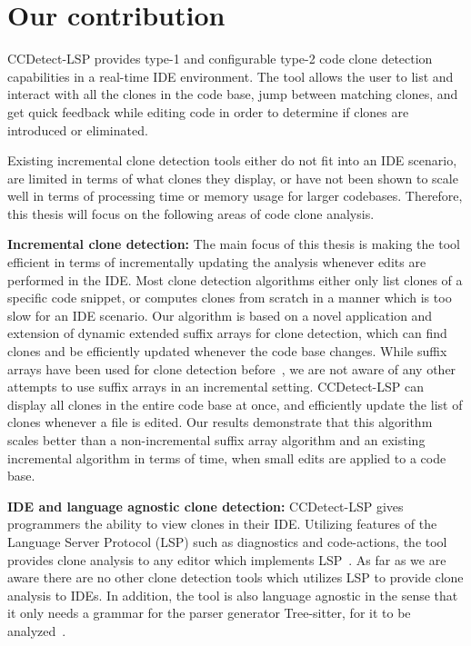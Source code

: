 \section{Our contribution}

CCDetect-LSP provides type-1 and configurable type-2 code clone detection capabilities in
a real-time IDE environment. The tool allows the user to list and interact with all the
clones in the code base, jump between matching clones, and get quick feedback while
editing code in order to determine if clones are introduced or eliminated.

Existing incremental clone detection tools either do not fit into an IDE scenario, are
limited in terms of what clones they display, or have not been shown to scale well in
terms of processing time or memory usage for larger codebases. Therefore, this thesis will
focus on the following areas of code clone analysis.

\textbf{Incremental clone detection:} The main focus of this thesis is making the tool
efficient in terms of incrementally updating the analysis whenever edits are performed in
the IDE. Most clone detection algorithms either only list clones of a specific code
snippet, or computes clones from scratch in a manner which is too slow for an IDE
scenario. Our algorithm is based on a novel application and extension of dynamic extended
suffix arrays for clone detection, which can find clones and be efficiently updated
whenever the code base changes. While suffix arrays have been used for clone detection
before~\cite{SHINOBI}, we are not aware of any other attempts to use suffix arrays in an
incremental setting. CCDetect-LSP can display all clones in the entire code base at once,
and efficiently update the list of clones whenever a file is edited. Our results
demonstrate that this algorithm scales better than a non-incremental suffix array
algorithm and an existing incremental algorithm in terms of time, when small edits are
applied to a code base.

\textbf{IDE and language agnostic clone detection:} CCDetect-LSP gives programmers the
ability to view clones in their IDE. Utilizing features of the Language Server Protocol
(LSP) such as diagnostics and code-actions, the tool provides clone analysis to any editor
which implements LSP~\cite{lsp}. As far as we are aware there are no other clone detection
tools which utilizes LSP to provide clone analysis to IDEs. In addition, the tool is also
language agnostic in the sense that it only needs a grammar for the parser generator
Tree-sitter, for it to be analyzed~\cite{treesitter}. 

